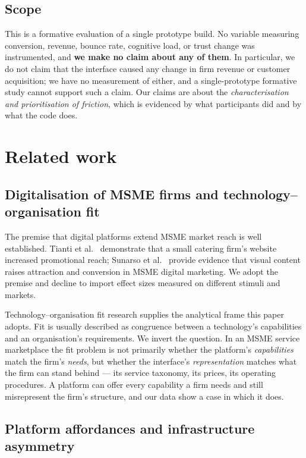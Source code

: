 \documentclass[]{interact}
\theoremstyle{plain}
\begin{document}
\subsection{Scope}

This is a formative evaluation of a single prototype build. No variable measuring conversion, revenue,
bounce rate, cognitive load, or trust change was instrumented, and \textbf{we make no claim about any
of them}. In particular, we do not claim that the interface caused any change in firm revenue or
customer acquisition; we have no measurement of either, and a single-prototype formative study cannot
support such a claim. Our claims are about the \emph{characterisation and prioritisation of friction},
which is evidenced by what participants did and by what the code does.

\section{Related work}

\subsection{Digitalisation of MSME firms and technology--organisation fit}

The premise that digital platforms extend MSME market reach is well established. Tianti et al.\
\citep{tianti2024} demonstrate that a small catering firm's website increased promotional reach;
Sunarso et al.~\citep{sunarso2023} provide evidence that visual content raises attraction and
conversion in MSME digital marketing. We adopt the premise and decline to import effect sizes measured
on different stimuli and markets.

Technology--organisation fit research \citep{nadler1989,tbdTechnologyOrganisationFit} supplies the
analytical frame this paper adopts. Fit is usually described as congruence between a technology's
capabilities and an organisation's requirements. We invert the question. In an MSME service marketplace
the fit problem is not primarily whether the platform's \emph{capabilities} match the firm's
\emph{needs}, but whether the interface's \emph{representation} matches what the firm can stand behind
--- its service taxonomy, its prices, its operating procedures. A platform can offer every capability a
firm needs and still misrepresent the firm's structure, and our data show a case in which it does.

\subsection{Platform affordances and infrastructure asymmetry}
\end{document}
